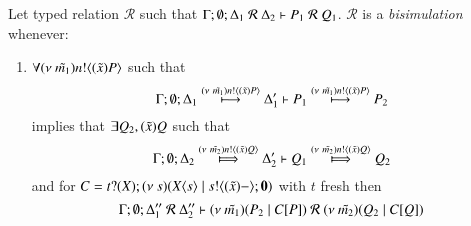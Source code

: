 \begin{definition}[Bisimulation]\rm
	Let typed relation $\mathcal{R}$ such that $\Gamma; \emptyset; \Delta_1\ \mathcal{R}\ \Delta_2 \proves P_1\ \mathcal{R}\ Q_1$.
	$\mathcal{R}$ is a {\em bisimulation} whenever:
	\begin{enumerate}
		\item	$\forall (\nu\ \tilde{m_1}) n ! \langle (\tilde{x})P \rangle$ such that
			\[
				\Gamma; \emptyset; \Delta_1 \stackrel{(\nu\ \tilde{m_1}) n ! \langle (\tilde{x})P \rangle}{\longmapsto} \Delta_1' \vdash P_1 \stackrel{(\nu\ \tilde{m_1}) n ! \langle (\tilde{x})P \rangle}{\longmapsto} P_2
			\]
			implies that $\exists Q_2, (\tilde{x})Q$ such that
			\[
				\Gamma; \emptyset; \Delta_2 \Hby{\news{\tilde{m_2}} \bactout{n}{\abs{\tilde{x}}{Q}}} \Delta_2' \proves Q_1 \Hby{\news{\tilde{m_2}} \bactout{n}{\abs{\tilde{x}}{Q}}} Q_2
			\]
			and for $C = t ? (X) ; (\nu\ s)(X\langle s \rangle \;|\; s ! \langle (\tilde{x})- \rangle ; \mathbf{0})$ with $t$ fresh
			then
			\[
				\Gamma; \emptyset; \Delta_1''\ \mathcal{R}\ \Delta_2'' \proves
				\newsp{\tilde{m_1}}{P_2 \Par \context{C}{P}}
				\ \mathcal{R}\ 
				\newsp{\tilde{m_2}}{Q_2 \Par \context{C}{Q}}
			\]



\end{enumerate}
\end{definition}

